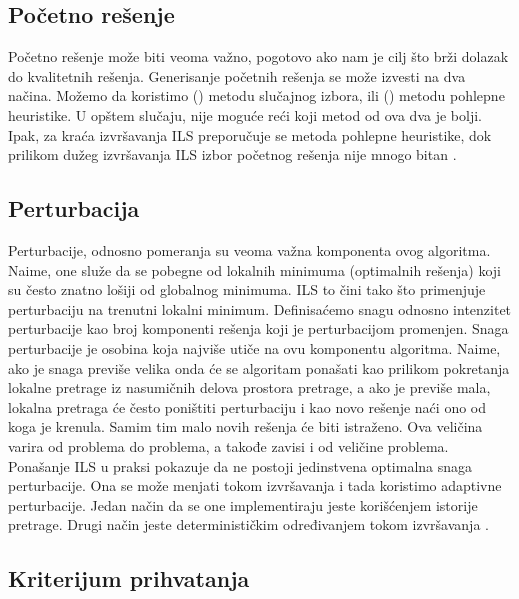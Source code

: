 \documentclass[a4paper]{article}
\begin{document}
\subsection{Početno rešenje}

Početno rešenje može biti veoma važno, pogotovo ako nam je cilj što brži dolazak do kvalitetnih rešenja. 
Generisanje početnih rešenja se može izvesti na dva načina. Možemo da koristimo () metodu slučajnog izbora, 
ili () metodu pohlepne heuristike. U opštem slučaju, nije moguće reći koji metod od ova dva je bolji. Ipak, za kraća 
izvršavanja ILS preporučuje se metoda pohlepne heuristike, dok prilikom dužeg izvršavanja ILS izbor početnog rešenja nije mnogo bitan \cite{beginnersIntroduction, online}.

\subsection{Perturbacija}

Perturbacije, odnosno pomeranja su veoma važna komponenta ovog algoritma. Naime, one služe da se pobegne od lokalnih minimuma (optimalnih rešenja) koji su često 
znatno lošiji od globalnog minimuma. ILS to čini tako što primenjuje perturbaciju na trenutni lokalni minimum. Definisaćemo snagu odnosno intenzitet perturbacije 
kao broj komponenti rešenja koji je perturbacijom promenjen. Snaga perturbacije je osobina koja najviše utiče na ovu komponentu algoritma. Naime, ako je snaga previše velika 
onda će se algoritam ponašati kao prilikom pokretanja lokalne pretrage iz nasumičnih delova prostora pretrage, a ako je previše mala, lokalna pretraga će često 
poništiti perturbaciju i kao novo rešenje 
naći ono od koga je krenula. Samim tim malo novih rešenja će biti istraženo. Ova veličina varira od problema do problema, a takođe zavisi i od veličine problema. 
Ponašanje ILS u praksi pokazuje da ne postoji jedinstvena optimalna snaga perturbacije. Ona se može menjati tokom izvršavanja i tada koristimo adaptivne perturbacije. 
Jedan način da se one implementiraju jeste korišćenjem istorije pretrage. Drugi način jeste determinističkim određivanjem tokom izvršavanja \cite{handbookOfMetaheuristics, beginnersIntroduction}.

\subsection{Kriterijum prihvatanja}
\end{document}
